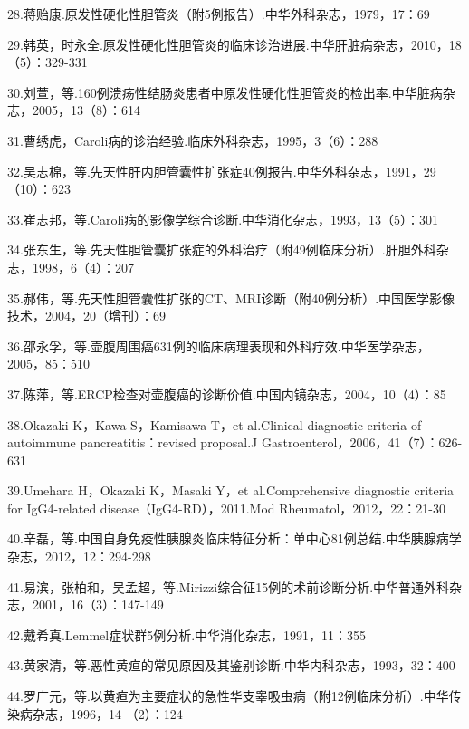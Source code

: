 28.蒋贻康.原发性硬化性胆管炎（附5例报告）.中华外科杂志，1979，17：69

29.韩英，时永全.原发性硬化性胆管炎的临床诊治进展.中华肝脏病杂志，2010，18（5）：329-331

30.刘萱，等.160例溃疡性结肠炎患者中原发性硬化性胆管炎的检出率.中华脏病杂志，2005，13（8）：614

31.曹绣虎，Caroli病的诊治经验.临床外科杂志，1995，3（6）：288

32.吴志棉，等.先天性肝内胆管囊性扩张症40例报告.中华外科杂志，1991，29（10）：623

33.崔志邦，等.Caroli病的影像学综合诊断.中华消化杂志，1993，13（5）：301

34.张东生，等.先天性胆管囊扩张症的外科治疗（附49例临床分析）.肝胆外科杂志，1998，6（4）：207

35.郝伟，等.先天性胆管囊性扩张的CT、MRI诊断（附40例分析）.中国医学影像技术，2004，20（增刊）：69

36.邵永孚，等.壶腹周围癌631例的临床病理表现和外科疗效.中华医学杂志，2005，85：510

37.陈萍，等.ERCP检查对壶腹癌的诊断价值.中国内镜杂志，2004，10（4）：85

38.Okazaki K，Kawa S，Kamisawa T，et al.Clinical diagnostic criteria of
autoimmune pancreatitis：revised proposal.J
Gastroenterol，2006，41（7）：626-631

39.Umehara H，Okazaki K，Masaki Y，et al.Comprehensive diagnostic
criteria for IgG4-related disease（IgG4-RD），2011.Mod
Rheumatol，2012，22：21-30

40.辛磊，等.中国自身免疫性胰腺炎临床特征分析：单中心81例总结.中华胰腺病学杂志，2012，12：294-298

41.易滨，张柏和，吴孟超，等.Mirizzi综合征15例的术前诊断分析.中华普通外科杂志，2001，16（3）：147-149

42.戴希真.Lemmel症状群5例分析.中华消化杂志，1991，11：355

43.黄家清，等.恶性黄疸的常见原因及其鉴别诊断.中华内科杂志，1993，32：400

44.罗广元，等.以黄疸为主要症状的急性华支睾吸虫病（附12例临床分析）.中华传染病杂志，1996，14
（2）：124

\protect\hypertarget{text00219.html}{}{}

